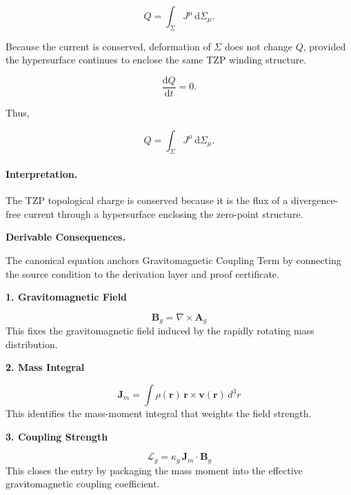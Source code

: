 \begin{equation}
Q
=
\int_{\Sigma}
J^\mu
\,\mathrm{d}\Sigma_\mu .
\end{equation}

Because the current is conserved, deformation of $\Sigma$ does not change $Q$, provided the hypersurface continues to enclose the same TZP winding structure.

\begin{equation}
\frac{\mathrm{d}Q}{\mathrm{d}t}=0 .
\end{equation}

Thus,

\begin{equation}
\boxed{
Q
=
\int_{\Sigma}
J^\mu
\,\mathrm{d}\Sigma_\mu .
}
\end{equation}

\paragraph{Interpretation.}
The TZP topological charge is conserved because it is the flux of a divergence-free current through a hypersurface enclosing the zero-point structure.

\par\vspace{0.35em}
\noindent\textbf{Derivable Consequences.}\quad
\begingroup
\footnotesize
\raggedright
The canonical equation anchors Gravitomagnetic Coupling Term by connecting the source condition to the derivation layer and proof certificate.
\par\endgroup

\noindent\textbf{1. Gravitomagnetic Field}\par
\[
\mathbf{B}_{g}=\nabla\times\mathbf{A}_{g}
\]
\noindent This fixes the gravitomagnetic field induced by the rapidly rotating mass distribution.\par
\noindent\textbf{2. Mass Integral}\par
\[
\mathbf{J}_{m}=\int \rho(\mathbf{r})\,\mathbf{r}\times\mathbf{v}(\mathbf{r})\,d^{3}r
\]
\noindent This identifies the mass-moment integral that weights the field strength.\par
\noindent\textbf{3. Coupling Strength}\par
\[
\mathcal{L}_{g}=\kappa_{g}\,\mathbf{J}_{m}\cdot\mathbf{B}_{g}
\]
\noindent This closes the entry by packaging the mass moment into the effective gravitomagnetic coupling coefficient.\par


